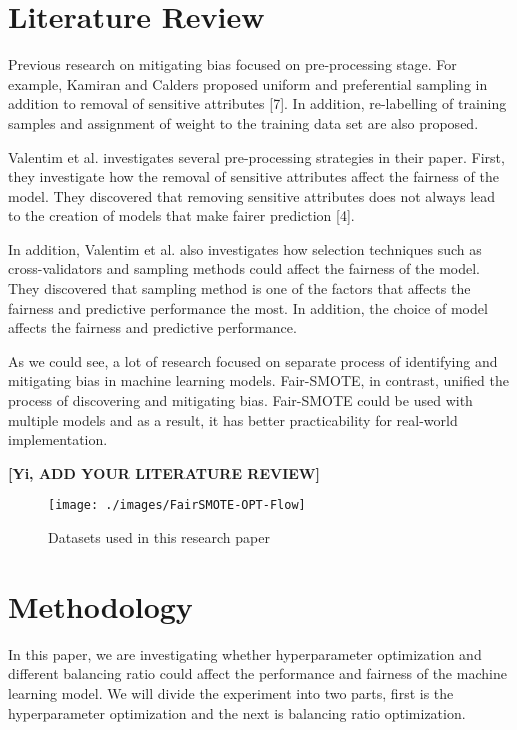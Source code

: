 \documentclass[sigconf]{acmart}
\begin{document}
\newpage
\section{Literature Review}

Previous research on mitigating bias focused on pre-processing stage. For example, Kamiran and Calders proposed uniform and preferential sampling in addition to removal of sensitive attributes [7]. In addition, re-labelling of training samples and assignment of weight to the training data set are also proposed.

Valentim et al. investigates several pre-processing strategies in their paper. First, they investigate how the removal of sensitive attributes affect the fairness of the model. They discovered that removing sensitive attributes does not always lead to the creation of models that make fairer prediction [4]. 

In addition, Valentim et al. also investigates how selection techniques such as cross-validators and sampling methods could affect the fairness of the model. They discovered that sampling method is one of the factors that affects the fairness and predictive performance the most. In addition, the choice of model affects the fairness and predictive performance.

As we could see, a lot of research focused on separate process of identifying and mitigating bias in machine learning models. Fair-SMOTE, in contrast, unified the process of discovering and mitigating bias. Fair-SMOTE could be used with multiple models and as a result, it has better practicability for real-world implementation.

\textbf{[Yi, ADD YOUR LITERATURE REVIEW]}

\begin{figure*}[t]
  \centering
  \texttt{[image: ./images/FairSMOTE-OPT-Flow]}
  \caption{Datasets used in this research paper}
\end{figure*}
\section{Methodology}

In this paper, we are investigating whether hyperparameter optimization and different balancing ratio could affect the performance and fairness of the machine learning model. We will divide the experiment into two parts, first is the hyperparameter optimization and the next is balancing ratio optimization. 
\end{document}
